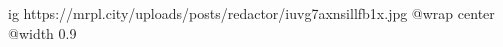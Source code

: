  
 
 
 
 

\ifcmt
  ig https://mrpl.city/uploads/posts/redactor/iuvg7axnsillfb1x.jpg
  @wrap center
  @width 0.9
\fi
